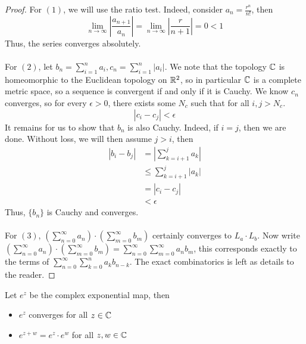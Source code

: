 \documentclass{article}
\begin{document}
\begin{proof}
For $(1)$, we will use the ratio test. Indeed, consider $a_n = \frac{r^n}{n!}$, then
\[\lim_{n \to \infty} |\frac{a_{n+1}}{a_n}| = \lim_{n \to \infty} |\frac{r}{n + 1}| = 0 < 1\]
Thus, the series converges absolutely.\\\\
For $(2)$, let $b_n = \sum_{i = 1}^n a_i, c_n = \sum_{i = 1}^n |a_i|$. We note that the topology $\mathbb{C}$ is homeomorphic to the Euclidean topology on $\mathbb{R}^2$, so in particular $\mathbb{C}$ is a complete metric space, so a sequence is convergent if and only if it is Cauchy. We know $c_n$ converges, so for every $\epsilon > 0$, there exists some $N_c$ such that for all $i, j > N_c$.
\[|c_i - c_j| < \epsilon\]
It remains for us to show that $b_n$ is also Cauchy. Indeed, if $i = j$, then we are done. Without loss, we will then assume $j > i$, then
\begin{align*}
    |b_i - b_j| &= |\sum_{k = i + 1}^j a_k|\\
    &\leq \sum_{k = i + 1}^j |a_k| \tag*{Triangle's Inequality}\\
    &= |c_i - c_j|\\
    &< \epsilon
\end{align*}
Thus, $\{b_n\}$ is Cauchy and converges.\\\\
For $(3)$, $(\sum_{n = 0}^\infty a_n) \cdot (\sum_{m = 0}^\infty b_m)$ certainly converges to $L_a \cdot L_b$. Now write $(\sum_{n = 0}^\infty a_n) \cdot (\sum_{m = 0}^\infty b_m) = \sum_{n = 0}^\infty \sum_{m = 0}^\infty a_n b_m$, this corresponds exactly to the terms of $\sum_{n = 0}^\infty \sum_{k = 0}^n a_k b_{n - k}$. The exact combinatorics is left as details to the reader.
\end{proof}

\begin{corollary}
Let $e^z$ be the complex exponential map, then
\begin{itemize}
    \item $e^z$ converges for all $z \in \mathbb{C}$
    \item $e^{z + w} = e^z \cdot e^w$ for all $z, w \in \mathbb{C}$
\end{itemize}
\end{corollary}
\end{document}
